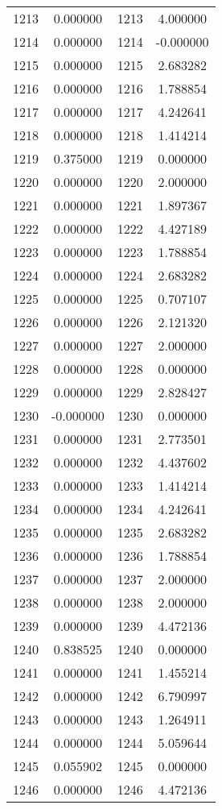 \documentclass[12pt]{article}
\begin{document}
\begin{longtable}{@{}cccc@{}}
1213 & 0.000000 & 1213 & 4.000000 \\
1214 & 0.000000 & 1214 & -0.000000 \\
1215 & 0.000000 & 1215 & 2.683282 \\
1216 & 0.000000 & 1216 & 1.788854 \\
1217 & 0.000000 & 1217 & 4.242641 \\
1218 & 0.000000 & 1218 & 1.414214 \\
1219 & 0.375000 & 1219 & 0.000000 \\
1220 & 0.000000 & 1220 & 2.000000 \\
1221 & 0.000000 & 1221 & 1.897367 \\
1222 & 0.000000 & 1222 & 4.427189 \\
1223 & 0.000000 & 1223 & 1.788854 \\
1224 & 0.000000 & 1224 & 2.683282 \\
1225 & 0.000000 & 1225 & 0.707107 \\
1226 & 0.000000 & 1226 & 2.121320 \\
1227 & 0.000000 & 1227 & 2.000000 \\
1228 & 0.000000 & 1228 & 0.000000 \\
1229 & 0.000000 & 1229 & 2.828427 \\
1230 & -0.000000 & 1230 & 0.000000 \\
1231 & 0.000000 & 1231 & 2.773501 \\
1232 & 0.000000 & 1232 & 4.437602 \\
1233 & 0.000000 & 1233 & 1.414214 \\
1234 & 0.000000 & 1234 & 4.242641 \\
1235 & 0.000000 & 1235 & 2.683282 \\
1236 & 0.000000 & 1236 & 1.788854 \\
1237 & 0.000000 & 1237 & 2.000000 \\
1238 & 0.000000 & 1238 & 2.000000 \\
1239 & 0.000000 & 1239 & 4.472136 \\
1240 & 0.838525 & 1240 & 0.000000 \\
1241 & 0.000000 & 1241 & 1.455214 \\
1242 & 0.000000 & 1242 & 6.790997 \\
1243 & 0.000000 & 1243 & 1.264911 \\
1244 & 0.000000 & 1244 & 5.059644 \\
1245 & 0.055902 & 1245 & 0.000000 \\
1246 & 0.000000 & 1246 & 4.472136 \\

\end{longtable}
\end{document}
